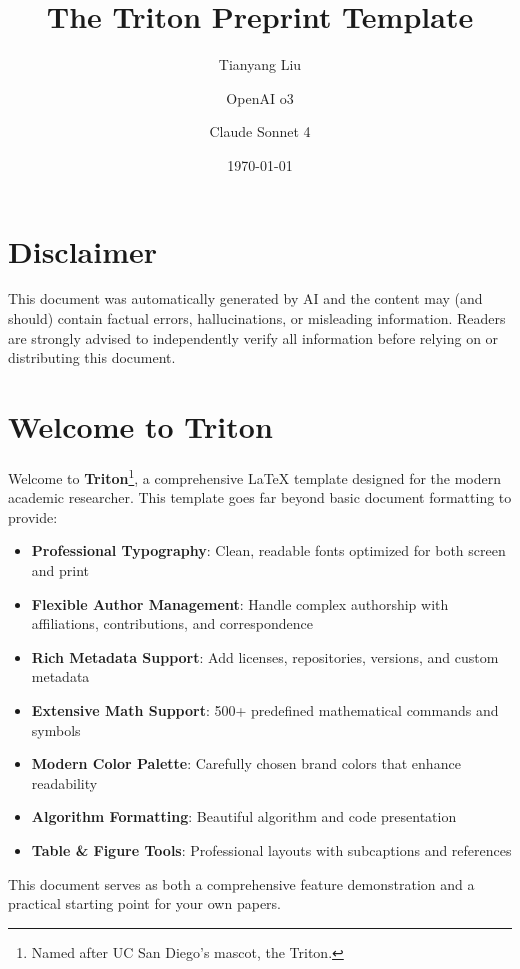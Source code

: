 \documentclass{triton}
\title{The Triton Preprint Template}
\author[1]{Tianyang Liu}
\author[2,*]{OpenAI o3}
\author[3,*]{Claude Sonnet 4}
\affiliation[1]{University of California San Diego}
\affiliation[2]{OpenAI}
\affiliation[3]{Anthropic}
\date{\today}
\begin{document}
\maketitle

\section*{Disclaimer}

\textcolor{ucsdgold}{This document was automatically generated by AI and the content may (and should) contain factual errors, hallucinations, or misleading information. Readers are strongly advised to independently verify all information before relying on or distributing this document.}

\section{Welcome to Triton}

Welcome to \textbf{Triton}\footnote{Named after UC San Diego's mascot, the Triton.}, a comprehensive \LaTeX{} template designed for the modern academic researcher. This template goes far beyond basic document formatting to provide:

\begin{itemize}[leftmargin=15pt]
    \item \textbf{Professional Typography}: Clean, readable fonts optimized for both screen and print
    \item \textbf{Flexible Author Management}: Handle complex authorship with affiliations, contributions, and correspondence
    \item \textbf{Rich Metadata Support}: Add licenses, repositories, versions, and custom metadata
    \item \textbf{Extensive Math Support}: 500+ predefined mathematical commands and symbols
    \item \textbf{Modern Color Palette}: Carefully chosen brand colors that enhance readability
    \item \textbf{Algorithm Formatting}: Beautiful algorithm and code presentation
    \item \textbf{Table \& Figure Tools}: Professional layouts with subcaptions and references
\end{itemize}

This document serves as both a comprehensive feature demonstration and a practical starting point for your own papers.
\end{document}
